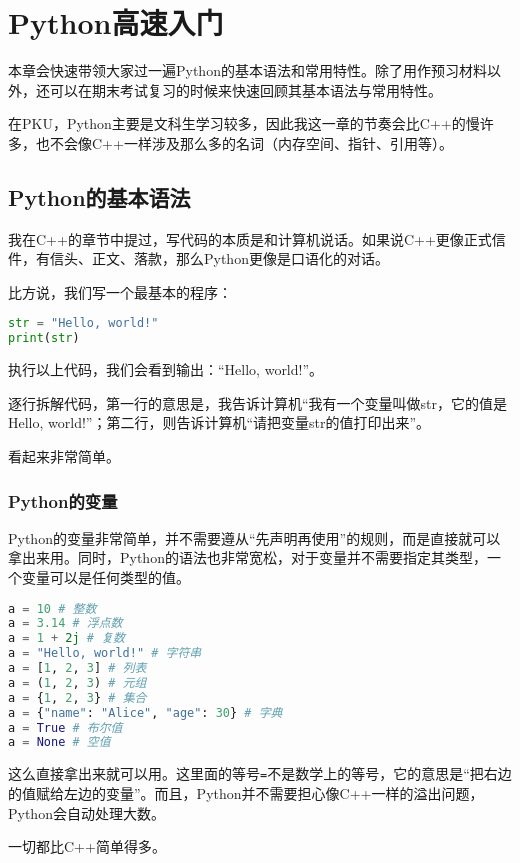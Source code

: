 \documentclass[../main.tex]{subfiles}
\begin{document}
\chapter{Python高速入门}

本章会快速带领大家过一遍Python的基本语法和常用特性。除了用作预习材料以外，还可以在期末考试复习的时候来快速回顾其基本语法与常用特性。

在PKU，Python主要是文科生学习较多，因此我这一章的节奏会比C++的慢许多，也不会像C++一样涉及那么多的名词（内存空间、指针、引用等）。

\section{Python的基本语法}

我在C++的章节中提过，写代码的本质是和计算机说话。如果说C++更像正式信件，有信头、正文、落款，那么Python更像是口语化的对话。

比方说，我们写一个最基本的程序：

\begin{lstlisting}[language=python]
str = "Hello, world!"
print(str)
\end{lstlisting}

执行以上代码，我们会看到输出：“Hello, world!”。

逐行拆解代码，第一行的意思是，我告诉计算机“我有一个变量叫做str，它的值是Hello, world!”；第二行，则告诉计算机“请把变量str的值打印出来”。

看起来非常简单。

\subsection{Python的变量}

Python的变量非常简单，并不需要遵从“先声明再使用”的规则，而是直接就可以拿出来用。同时，Python的语法也非常宽松，对于变量并不需要指定其类型，一个变量可以是任何类型的值。

\begin{lstlisting}[language=python]
a = 10 # 整数
a = 3.14 # 浮点数
a = 1 + 2j # 复数
a = "Hello, world!" # 字符串
a = [1, 2, 3] # 列表
a = (1, 2, 3) # 元组
a = {1, 2, 3} # 集合
a = {"name": "Alice", "age": 30} # 字典
a = True # 布尔值
a = None # 空值
\end{lstlisting}
这么直接拿出来就可以用。这里面的等号\texttt{=}不是数学上的等号，它的意思是“把右边的值赋给左边的变量”。而且，Python并不需要担心像C++一样的溢出问题，Python会自动处理大数。

一切都比C++简单得多。
\end{document}
